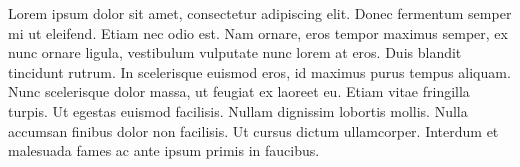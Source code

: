 Lorem ipsum dolor sit amet, consectetur adipiscing elit. Donec fermentum semper mi ut eleifend. Etiam nec odio est. Nam ornare, eros tempor maximus semper, ex nunc ornare ligula, vestibulum vulputate nunc lorem at eros. Duis blandit tincidunt rutrum. In scelerisque euismod eros, id maximus purus tempus aliquam. Nunc scelerisque dolor massa, ut feugiat ex laoreet eu. Etiam vitae fringilla turpis. Ut egestas euismod facilisis. Nullam dignissim lobortis mollis. Nulla accumsan finibus dolor non facilisis. Ut cursus dictum ullamcorper. Interdum et malesuada fames ac ante ipsum primis in faucibus. 
